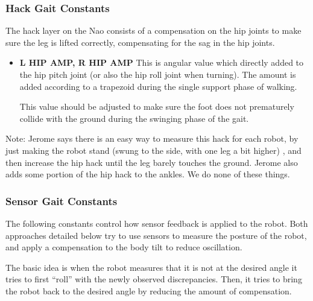 \documentclass[11pt]{article}
\begin{document}
\subsubsection{Hack Gait Constants}
The hack layer on the Nao consists of a compensation on the hip joints
to make sure the leg is lifted correctly, compensating for the sag in the hip
joints.
\begin{itemize}
\item {\bf L HIP AMP, R HIP AMP}  This is angular value which directly added
to the hip pitch joint (or also the hip roll joint when turning). The amount
is added according to a trapezoid during the single support phase of walking.

This value should be adjusted to make sure the foot does not prematurely
collide with the ground during the swinging phase of the gait.
\end{itemize}
Note:  Jerome says there is an easy way to measure this hack for each robot,
by just making the robot stand (swung to the side, with one leg a bit higher)
, and then increase the hip
hack until the leg barely touches the ground.  Jerome also adds some portion
of the hip hack to the ankles. We do none of these things.

\subsubsection{Sensor Gait Constants}
The following constants control how sensor feedback is applied to the robot.
Both approaches detailed below try to use sensors to measure the posture of
the robot, and apply a compensation to the body tilt to reduce oscillation.

The basic idea is when the robot measures that it is not at the desired angle
it tries to first ``roll'' with the newly observed discrepancies. Then, it
tries to bring the robot back to the desired angle by reducing the amount of
compensation.
\end{document}
